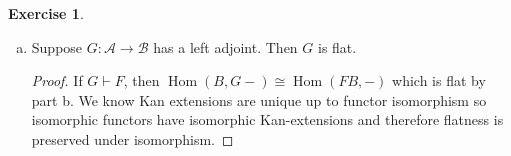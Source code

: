\documentclass{article}
\DeclareMathOperator{\Hom}{Hom}
\theoremstyle{definition}
\newtheorem{question}{Exercise}
\begin{document}
\begin{question}
\begin{enumerate}[(a)]
        \item Suppose \(G:\mathcal{A}\to\mathcal{B}\) has a left adjoint. Then
              \(G\) is flat.

              \begin{proof}
                  If \(G\vdash F\), then \(\Hom(B,G-)\cong\Hom(FB,-)\) which is
                  flat by part b. We know Kan extensions are unique up to
                  functor isomorphism so isomorphic functors have isomorphic
                  Kan-extensions and therefore flatness is preserved under
                  isomorphism.
              \end{proof}
    \end{enumerate}
\end{question}
\end{document}
